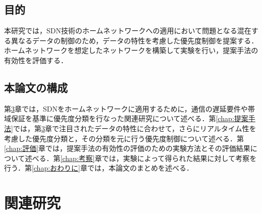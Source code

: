\documentclass[a4paper,11pt,uplatex]{ujreport}
\begin{document}
\section{目的}
\label{sec:目的}

    本研究では，SDN技術のホームネットワークへの適用において問題となる混在する異なるデータの制御のため，データの特性を考慮した優先度制御を提案する．
    ホームネットワークを想定したネットワークを構築して実験を行い，提案手法の有効性を評価する．





\section{本論文の構成}
\label{sec:本論文の構成}

  第\ref{chap:関連研究}章では，SDNをホームネットワークに適用するために，通信の遅延要件や帯域保証を基準に優先度分類を行なった関連研究について述べる．第\ref{chap:提案手法}では，第\ref{chap:関連研究}章で注目されたデータの特性に合わせて，さらにリアルタイム性を考慮した優先度分類と，その分類を元に行う優先度制御について述べる．第\ref{chap:評価}章では，提案手法の有効性の評価のための実験方法とその評価結果について述べる．第\ref{chap:考察}章では，実験によって得られた結果に対して考察を行う．第\ref{chap:おわりに}章では，本論文のまとめを述べる．


\chapter{関連研究}
\label{chap:関連研究}
\end{document}
